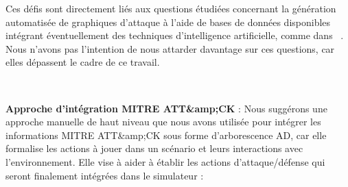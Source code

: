 Ces défis sont directement liés aux questions étudiées concernant la génération automatisée de graphiques d'attaque à l'aide de bases de données disponibles intégrant éventuellement des techniques d'intelligence artificielle, comme dans ~\cite{GFalco2018}. Nous n'avons pas l'intention de nous attarder davantage sur ces questions, car elles dépassent le cadre de ce travail.

\

\noindent
\textbf{Approche d'intégration MITRE ATT\&amp;CK} : Nous suggérons une approche manuelle de haut niveau que nous avons utilisée pour intégrer les informations MITRE ATT\&amp;CK sous forme d'arborescence AD, car elle formalise les actions à jouer dans un scénario et leurs interactions avec l'environnement. Elle vise à aider à établir les actions d'attaque/défense qui seront finalement intégrées dans le simulateur :
